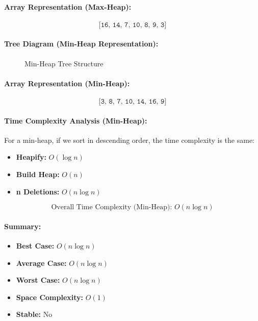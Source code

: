 \paragraph{Array Representation (Max-Heap):}

\[
\texttt{[16, 14, 7, 10, 8, 9, 3]}
\]

\paragraph{Tree Diagram (Min-Heap Representation):}

\begin{figure}[H]
\centering
{}
\caption{Min-Heap Tree Structure}
\end{figure}

\paragraph{Array Representation (Min-Heap):}

\[
\texttt{[3, 8, 7, 10, 14, 16, 9]}
\]

\paragraph{Time Complexity Analysis (Min-Heap):}
For a min-heap, if we sort in descending order, the time complexity is the same:
\begin{itemize}
  \item \textbf{Heapify:} \( O(\log n) \)
  \item \textbf{Build Heap:} \( O(n) \)
  \item \textbf{n Deletions:} \( O(n \log n) \)
\end{itemize}

\[
\boxed{\text{Overall Time Complexity (Min-Heap): } O(n \log n)}
\]

\paragraph{Summary:}
\begin{itemize}
  \item \textbf{Best Case:} \( O(n \log n) \)
  \item \textbf{Average Case:} \( O(n \log n) \)
  \item \textbf{Worst Case:} \( O(n \log n) \)
  \item \textbf{Space Complexity:} \( O(1) \)
  \item \textbf{Stable:} No
\end{itemize}


